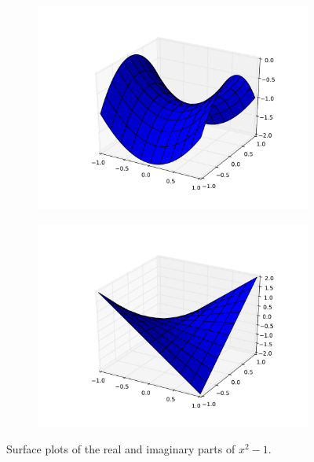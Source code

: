 \begin{figure}
\begin{subfigure}{.49\textwidth}
\includegraphics[width=\textwidth]{poly_surface_plot_real}
\end{subfigure}
\begin{subfigure}{.49\textwidth}
\includegraphics[width=\textwidth]{poly_surface_plot_imag}
\end{subfigure}
\caption{Surface plots of the real and imaginary parts of $x^2 - 1$.}
\label{fig:poly_surface_plot}
\end{figure}

